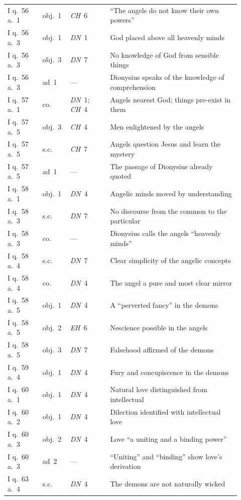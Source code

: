 {\begin{longtable}{@{}>{\raggedright\arraybackslash}p{0.14\linewidth}>{\raggedright\arraybackslash}p{0.10\linewidth}>{\raggedright\arraybackslash}p{0.16\linewidth}>{\raggedright\arraybackslash}p{0.52\linewidth}@{}}
I q.~56 a.~1 & obj.~1 & \emph{CH}~6 & ``The angels do not know their own powers'' \\
I q.~56 a.~3 & obj.~1 & \emph{DN}~1 & God placed above all heavenly minds \\
I q.~56 a.~3 & obj.~3 & \emph{DN}~7 & No knowledge of God from sensible things \\
I q.~56 a.~3 & ad~1 & --- & Dionysius speaks of the knowledge of comprehension \\
I q.~57 a.~1 & co. & \emph{DN}~1; \emph{CH}~4 & Angels nearest God; things pre-exist in them \\
I q.~57 a.~5 & obj.~3 & \emph{CH}~4 & Men enlightened by the angels \\
I q.~57 a.~5 & s.c. & \emph{CH}~7 & Angels question Jesus and learn the mystery \\
I q.~57 a.~5 & ad~1 & --- & The passage of Dionysius already quoted \\
I q.~58 a.~1 & obj.~1 & \emph{DN}~4 & Angelic minds moved by understanding \\
I q.~58 a.~3 & s.c. & \emph{DN}~7 & No discourse from the common to the particular \\
I q.~58 a.~3 & co. & --- & Dionysius calls the angels ``heavenly minds'' \\
I q.~58 a.~4 & s.c. & \emph{DN}~7 & Clear simplicity of the angelic concepts \\
I q.~58 a.~4 & co. & \emph{DN}~4 & The angel a pure and most clear mirror \\
I q.~58 a.~5 & obj.~1 & \emph{DN}~4 & A ``perverted fancy'' in the demons \\
I q.~58 a.~5 & obj.~2 & \emph{EH}~6 & Nescience possible in the angels \\
I q.~58 a.~5 & obj.~3 & \emph{DN}~7 & Falsehood affirmed of the demons \\
I q.~59 a.~4 & obj.~1 & \emph{DN}~4 & Fury and concupiscence in the demons \\
I q.~60 a.~1 & obj.~1 & \emph{DN}~4 & Natural love distinguished from intellectual \\
I q.~60 a.~2 & obj.~1 & \emph{DN}~4 & Dilection identified with intellectual love \\
I q.~60 a.~3 & obj.~2 & \emph{DN}~4 & Love ``a uniting and a binding power'' \\
I q.~60 a.~3 & ad~2 & --- & ``Uniting'' and ``binding'' show love's derivation \\
I q.~63 a.~4 & s.c. & \emph{DN}~4 & The demons are not naturally wicked \\

\end{longtable}}
